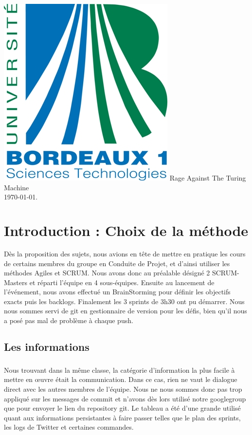 \documentclass[a4paper,francais,titlepage]{article}
\begin{document}
\begin{titlepage}
   \begin{center}
   \includegraphics[scale=0.3]{logo_bx1.jpg}
   	\vfill 
   	\vspace{1.5cm}
	\normalsize {Rage Against The Turing Machine\\}
	\vspace{1.5cm} 
	{\today}.
 \end{center}
\end{titlepage}

\section{Introduction : Choix de la méthode}
Dès la proposition des sujets, nous avions en tête de mettre en pratique les cours de certains membres du groupe en Conduite de Projet, et d'ainsi utiliser les méthodes Agiles et SCRUM. Nous avons donc au préalable désigné 2 SCRUM-Masters et réparti l'équipe en 4 sous-équipes. Ensuite au lancement de l'événement, nous avons effectué un BrainStorming pour définir les objectifs exacts puis les backlogs. Finalement les 3 sprints de 3h30 ont pu démarrer. Nous nous sommes servi de git en gestionnaire de version pour les défis, bien qu'il nous a posé pas mal de problème à chaque push.

\subsection*{Les informations}
\subparagraph{}Nous trouvant dans la même classe, la catégorie d'information la plus facile à mettre en œuvre était la communication. Dans ce cas, rien ne vaut le dialogue direct avec les autres membres de l'équipe. Nous ne nous sommes donc pas trop appliqué sur les messages de commit et n'avons dès lors utilisé notre googlegroup que pour envoyer le lien du repository git. Le tableau a été d'une grande utilisé quant aux informations persistantes à faire passer telles que le plan des sprints, les logs de Twitter et certaines commandes.
\end{document}
